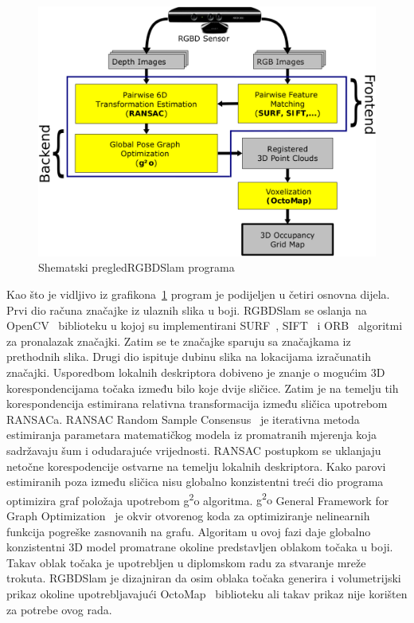 \begin{figure}[h]
\renewcommand{\figurename}{Grafikon}
\centering
\includegraphics[scale=0.27]{figures/rgbdslam-overview.png}
\caption[]{Shematski pregled\footnotemark[1] RGBDSlam programa}
\label{fig:rgbdslam-overview}
\end{figure}


Kao što je vidljivo iz grafikona~\ref{fig:rgbdslam-overview} program je
podijeljen u četiri osnovna dijela. Prvi dio računa značajke iz ulaznih
slika u boji. RGBDSlam se oslanja na OpenCV~\cite{opencv_library}
biblioteku u kojoj su implementirani SURF~\cite{Bay06surf:speeded},
SIFT~\cite{Lowe04distinctiveimage} i ORB~\cite{1302} algoritmi za
pronalazak značajki. Zatim se te značajke sparuju sa značajkama iz
prethodnih slika. Drugi dio ispituje dubinu slika na lokacijama
izračunatih značajki. Usporedbom lokalnih deskriptora dobiveno je znanje
o mogućim 3D korespondencijama točaka između bilo koje dvije sličice.
Zatim je na temelju tih korespondencija estimirana relativna
transformacija između sličica upotrebom RANSACa. RANSAC Random Sample
Consensus~\cite{AICPub836:1981} je iterativna metoda estimiranja
parametara matematičkog modela iz promatranih mjerenja koja sadržavaju
šum i odudarajuće vrijednosti. RANSAC postupkom se uklanjaju netočne
korespodencije ostvarne na temelju lokalnih deskriptora. Kako parovi
estimiranih poza između sličica nisu globalno konzistentni treći dio
programa optimizira graf položaja upotrebom g\textsuperscript{2}o
algoritma. {g\textsuperscript{2}o} General Framework for Graph
Optimization~\cite{kuemmerle11icra} je okvir otvorenog koda za
optimiziranje nelinearnih funkcija pogreške zasnovanih na grafu. 
Algoritam u ovoj fazi daje globalno konzistentni 3D model promatrane
okoline predstavljen oblakom točaka u boji. Takav oblak točaka je
upotrebljen u diplomskom radu za stvaranje mreže trokuta.
RGBDSlam je dizajniran da osim oblaka točaka generira i volumetrijski
prikaz okoline upotrebljavajući {OctoMap}~\cite{hornung13auro}
biblioteku ali takav prikaz nije korišten za potrebe ovog rada.

